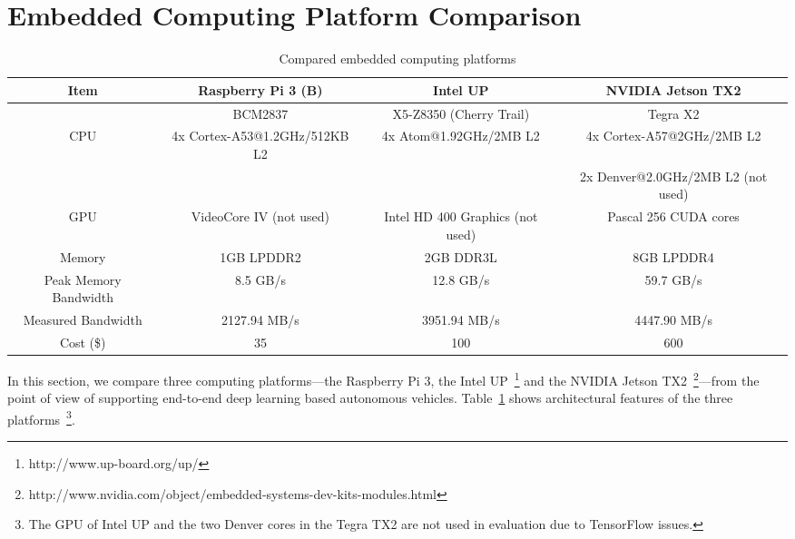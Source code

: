 
%

\section{Embedded Computing Platform Comparison}\label{sec:comparison}



\begin{table}[h]
  \centering
  \begin{adjustbox}{width=1\textwidth}
  \begin{tabular}{|c|c|c|c|}
    \hline
    Item    & Raspberry Pi 3 (B)   & Intel UP                  & NVIDIA Jetson TX2\\
    \hline
            & BCM2837              & X5-Z8350 (Cherry Trail)   & Tegra X2 \\
    CPU     & 4x Cortex-A53@1.2GHz/512KB L2  &
              4x Atom@1.92GHz/2MB L2 &
              4x Cortex-A57@2GHz/2MB L2 \\
            &              &              & 2x Denver@2.0GHz/2MB L2 (not used)  \\
    \hline
    GPU     &  VideoCore IV (not used)    &
               Intel HD 400 Graphics (not used) &
               Pascal 256 CUDA cores   \\
    \hline
    Memory  & 1GB LPDDR2   &  2GB DDR3L     & 8GB LPDDR4              \\
    \hline
	Peak Memory Bandwidth & 8.5 GB/s & 12.8 GB/s & 59.7 GB/s \\
	\hline
	Measured Bandwidth & 2127.94 MB/s & 3951.94 MB/s & 4447.90 MB/s \\
	\hline
	Cost (\$) & 35 & 100 & 600 \\
	\hline
  \end{tabular}
  \end{adjustbox}
  \caption{Compared embedded computing platforms}
  \label{tbl:platforms}
\end{table}

In this section, we compare three computing platforms---the Raspberry
Pi 3, the Intel UP~\footnote{http://www.up-board.org/up/} and the NVIDIA
Jetson
TX2~\footnote{http://www.nvidia.com/object/embedded-systems-dev-kits-modules.html}---from
the point of view of supporting end-to-end deep learning
based autonomous vehicles. 
Table~\ref{tbl:platforms} shows architectural features of the three
platforms~\footnote{The GPU of Intel UP and the two Denver cores in the
  Tegra TX2 are not used in evaluation due to TensorFlow issues.}.
  

